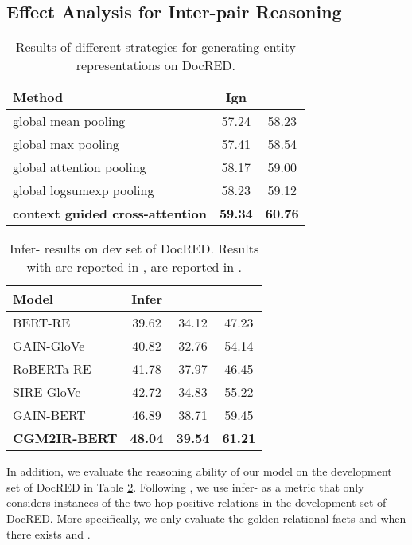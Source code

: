 \documentclass[11pt]{article}
\begin{document}
\subsection{Effect Analysis for Inter-pair Reasoning}
\begin{table}[t]
	\centering
	\small
	\begin{tabular}{lcc}
		\toprule
		
		Method & Ign   &    	\\ \hline 
		
		global mean pooling & 57.24 & 58.23   \\ 
		global max pooling  & 57.41 & 58.54  \\ 
		global attention pooling & 58.17 & 59.00  \\ 
		global logsumexp pooling & 58.23 & 59.12  \\ \midrule
		\textbf{context guided cross-attention}  & \textbf{59.34}  & \textbf{60.76}  \\ \bottomrule
		
	\end{tabular}
	\caption{Results of different strategies for generating entity representations on DocRED.}
	\label{tab:result_mention}
\end{table}
\begin{table}[t]
	\centering
	\small
	\begin{tabular}{lccc}
		\toprule
		
		Model & Infer   &    &  	\\ \hline 
		BERT-RE & 39.62 & 34.12 & 47.23 \\
		GAIN-GloVe & 40.82  & 32.76 & 54.14 \\
		RoBERTa-RE & 41.78  & 37.97 & 46.45\\
		SIRE-GloVe & 42.72 & 34.83 & 55.22 \\
		GAIN-BERT & 46.89 & 38.71 &  59.45  \\ \hline
		\textbf{CGM2IR-BERT}   & \textbf{48.04} & \textbf{39.54} &  \textbf{61.21}  \\ \bottomrule
		
		
	\end{tabular}
	\caption{Infer- results on dev set of DocRED. Results with  are reported in \citet{zeng-etal-2020-double},  are reported in \citet{zeng-etal-2021-sire}.}
	\label{tab:result_reasoning}
\end{table}
In addition, we evaluate the reasoning ability of our model on the development set of DocRED in Table \ref{tab:result_reasoning}.
Following \citet{zeng-etal-2021-sire}, we use infer- as a metric that only considers instances of the two-hop positive relations in the development set of DocRED.
More specifically, we only evaluate the golden relational facts  and  when there exists  and .
\end{document}
